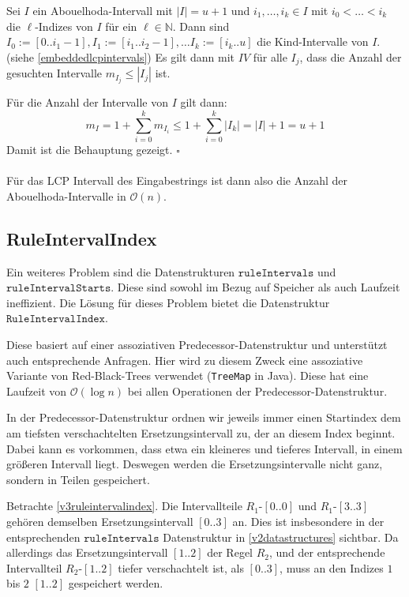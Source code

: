 Sei $I$ ein Abouelhoda-Intervall mit $|I| = u+1$ und $i_1, \dots, i_k \in I$ mit $i_0 < \dots < i_k$ die $\ell$-Indizes von $I$ für ein $\ell \in \mathbb{N}$. Dann sind $I_0 := [0..i_1-1], I_1 := [i_1..i_2-1], \dots I_k := [i_k..u]$ die Kind-Intervalle von $I$. (siehe \autoref{embeddedlcpintervals}) Es gilt dann mit $IV$ für alle $I_j$, dass die Anzahl der gesuchten Intervalle $m_{I_j} \leq |I_j|$ ist.

Für die Anzahl der Intervalle von $I$ gilt dann:
\begin{equation*}
    m_I = 1 + \sum_{i=0}^k m_{I_i} \leq 1 + \sum_{i=0}^k |I_k| = |I| + 1 = u + 1
\end{equation*}
Damit ist die Behauptung gezeigt. $\square$\\\\
Für das LCP Intervall des Eingabestrings ist dann also die Anzahl der Abouelhoda-Intervalle in $\mathcal{O}(n)$. 

\subsection{RuleIntervalIndex}

Ein weiteres Problem sind die Datenstrukturen $\texttt{ruleIntervals}$ und $\texttt{ruleIntervalStarts}$. Diese sind sowohl im Bezug auf Speicher als auch Laufzeit ineffizient. Die Lösung für dieses Problem bietet die Datenstruktur $\texttt{RuleIntervalIndex}$.

Diese basiert auf einer assoziativen Predecessor-Datenstruktur \cite{dinklage_engineering_2021} und unterstützt auch entsprechende Anfragen. Hier wird zu diesem Zweck eine assoziative Variante von Red-Black-Trees \cite{bayer_symmetric_1972, guibas_dichromatic_1978} verwendet (\texttt{TreeMap} in Java). Diese hat eine Laufzeit von $\mathcal{O}(\log n)$ bei allen Operationen der Predecessor-Datenstruktur. 

In der Predecessor-Datenstruktur ordnen wir jeweils immer einen Startindex dem am tiefsten verschachtelten Ersetzungsintervall zu, der an diesem Index beginnt. Dabei kann es vorkommen, dass etwa ein kleineres und tieferes Intervall, in einem größeren Intervall liegt. Deswegen werden die Ersetzungsintervalle nicht ganz, sondern in Teilen gespeichert. 

Betrachte \autoref{v3ruleintervalindex}. Die Intervallteile $R_1$-$[0..0]$ und $R_1$-$[3..3]$ gehören demselben Ersetzungsintervall $[0..3]$ an. Dies ist insbesondere in der entsprechenden $\texttt{ruleIntervals}$ Datenstruktur in \autoref{v2datastructures} sichtbar. Da allerdings das Ersetzungsintervall $[1..2]$ der Regel $R_2$, und der entsprechende Intervallteil $R_2$-$[1..2]$ tiefer verschachtelt ist, als $[0..3]$, muss an den Indizes $1$ bis $2$ $[1..2]$ gespeichert werden.

